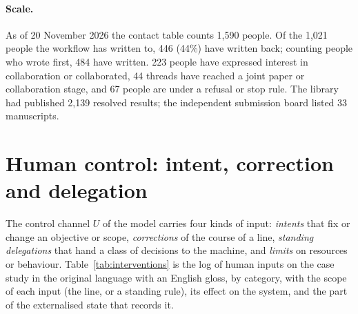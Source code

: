 \documentclass[11pt]{article}
\begin{document}
\paragraph{Scale.} As of 20 November 2026 the contact table counts 1{,}590
people. Of the 1{,}021 people the workflow has written to, 446 (44\%) have
written back; counting people who wrote first, 484 have written. 223 people
have expressed interest in collaboration or collaborated, 44 threads have
reached a joint paper or collaboration stage, and 67 people are under a
refusal or stop rule. The library had published 2{,}139 resolved results;
the independent submission board listed 33 manuscripts.

\section{Human control: intent, correction and delegation}
\label{sec:steering}
The control channel $U$ of the model carries four kinds of input:
\emph{intents} that fix or change an objective or scope, \emph{corrections}
of the course of a line, \emph{standing delegations} that hand a class of
decisions to the machine, and \emph{limits} on resources or behaviour.
Table~\ref{tab:interventions} is the log of human inputs on the case study
in the original language with an English gloss, by category, with the scope
of each input (the line, or a standing rule), its effect on the system, and
the part of the externalised state that records it.
\end{document}
